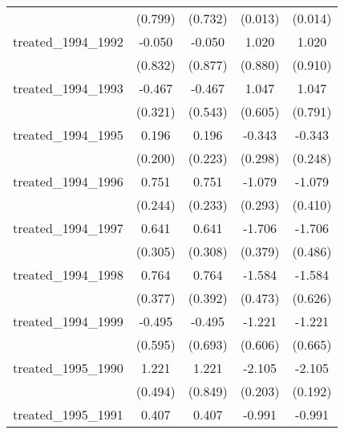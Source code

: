 {\begin{tabular}{l*{4}{c}}
            &     (0.799)         &     (0.732)         &     (0.013)         &     (0.014)         \\
[1em]
treated\_1994\_1992&      -0.050         &      -0.050         &       1.020         &       1.020         \\
            &     (0.832)         &     (0.877)         &     (0.880)         &     (0.910)         \\
[1em]
treated\_1994\_1993&      -0.467         &      -0.467         &       1.047         &       1.047         \\
            &     (0.321)         &     (0.543)         &     (0.605)         &     (0.791)         \\
[1em]
treated\_1994\_1995&       0.196         &       0.196         &      -0.343         &      -0.343         \\
            &     (0.200)         &     (0.223)         &     (0.298)         &     (0.248)         \\
[1em]
treated\_1994\_1996&       0.751\sym{**} &       0.751\sym{**} &      -1.079\sym{***}&      -1.079\sym{**} \\
            &     (0.244)         &     (0.233)         &     (0.293)         &     (0.410)         \\
[1em]
treated\_1994\_1997&       0.641\sym{*}  &       0.641\sym{*}  &      -1.706\sym{***}&      -1.706\sym{***}\\
            &     (0.305)         &     (0.308)         &     (0.379)         &     (0.486)         \\
[1em]
treated\_1994\_1998&       0.764\sym{*}  &       0.764         &      -1.584\sym{***}&      -1.584\sym{*}  \\
            &     (0.377)         &     (0.392)         &     (0.473)         &     (0.626)         \\
[1em]
treated\_1994\_1999&      -0.495         &      -0.495         &      -1.221\sym{*}  &      -1.221         \\
            &     (0.595)         &     (0.693)         &     (0.606)         &     (0.665)         \\
[1em]
treated\_1995\_1990&       1.221\sym{*}  &       1.221         &      -2.105\sym{***}&      -2.105\sym{***}\\
            &     (0.494)         &     (0.849)         &     (0.203)         &     (0.192)         \\
[1em]
treated\_1995\_1991&       0.407         &       0.407         &      -0.991         &      -0.991         \\

\end{tabular}}
